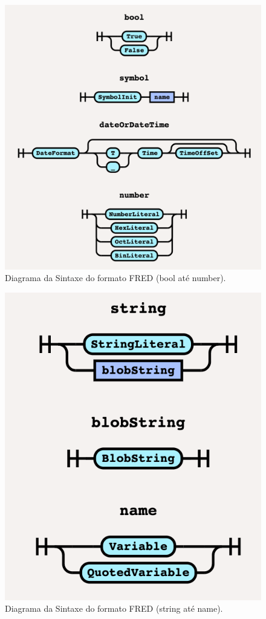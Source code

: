 \begin{apendicesenv}
\begin{figure}[]
	\centering
	\includegraphics[keepaspectratio=true,scale=0.5]{figuras/syntaxdiagram4.png}
	\caption{Diagrama da Sintaxe do formato FRED (bool até number).}
\end{figure}

\begin{figure}[]
	\centering
	\includegraphics[keepaspectratio=true,scale=1]{figuras/syntaxdiagram5.png}
	\caption{Diagrama da Sintaxe do formato FRED (string até name).}
\end{figure}



\end{apendicesenv}
